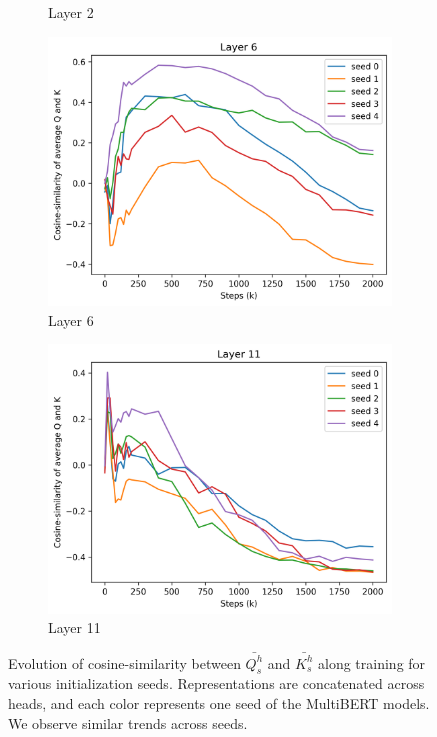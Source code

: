 \begin{appendices}
\begin{figure}[ht]
\begin{subfigure}[b]{0.24\linewidth}
         \caption{Layer 2}
         \label{fig:seeds_l2}
    \end{subfigure}
    \begin{subfigure}[b]{0.24\linewidth}
         \includegraphics[width=\linewidth]{sources/part_1/anisotropy/imgs/seeds_qk_l6.png}
         \caption{Layer 6}
         \label{fig:seeds_l6}
    \end{subfigure}
    \begin{subfigure}[b]{0.24\linewidth}
         \includegraphics[width=\linewidth]{sources/part_1/anisotropy/imgs/seeds_qk_l11.png}
         \caption{Layer 11}
         \label{fig:seeds_l11}
    \end{subfigure}
    \caption{Evolution of cosine-similarity between $\bar{Q^h_s}$ and $\bar{K^h_s}$ along training for various initialization seeds. Representations are concatenated across heads, and each color represents one seed of the MultiBERT models. We observe similar trends across seeds.}
    \label{fig:seeds_qk}
\end{figure}


\end{appendices}
